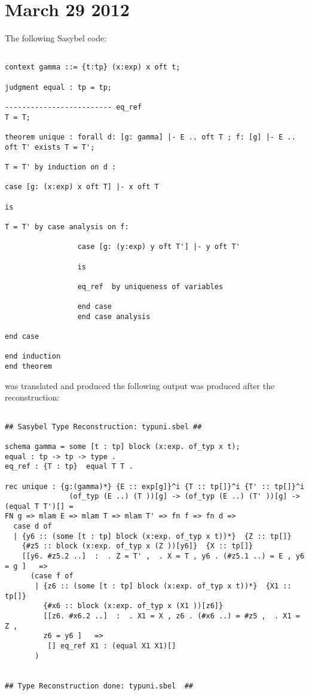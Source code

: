 \documentclass[12pt]{article}
\begin{document}
\section{March 29 2012}
The following \textmd{Sasybel} code:
\footnotesize\begin{verbatim}

context gamma ::= {t:tp} (x:exp) x oft t;

judgment equal : tp = tp;

------------------------- eq_ref
T = T;

theorem unique : forall d: [g: gamma] |- E .. oft T ; f: [g] |- E .. oft T' exists T = T';

T = T' by induction on d :

case [g: (x:exp) x oft T] |- x oft T

is

T = T' by case analysis on f:

                 case [g: (y:exp) y oft T'] |- y oft T'

                 is 

                 eq_ref  by uniqueness of variables

                 end case
                 end case analysis

end case

end induction
end theorem

\end{verbatim}
was translated and produced the following output was produced after the reconstruction:
\footnotesize\begin{verbatim}

## Sasybel Type Reconstruction: typuni.sbel ##

schema gamma = some [t : tp] block (x:exp. of_typ x t);
equal : tp -> tp -> type .
eq_ref : {T : tp}  equal T T .

rec unique : {g:(gamma)*} {E :: exp[g]}^i {T :: tp[]}^i {T' :: tp[]}^i
               (of_typ (E ..) (T ))[g] -> (of_typ (E ..) (T' ))[g] -> (equal T T')[] = 
FN g => mlam E => mlam T => mlam T' => fn f => fn d => 
  case d of 
  | {y6 :: (some [t : tp] block (x:exp. of_typ x t))*}  {Z :: tp[]} 
    {#z5 :: block (x:exp. of_typ x (Z ))[y6]}  {X :: tp[]}
    [[y6. #z5.2 ..]  :  . Z = T' ,  . X = T , y6 . (#z5.1 ..) = E , y6 = g ]   => 
      (case f of 
       | {z6 :: (some [t : tp] block (x:exp. of_typ x t))*}  {X1 :: tp[]} 
         {#x6 :: block (x:exp. of_typ x (X1 ))[z6]}
         [[z6. #x6.2 ..]  :  . X1 = X , z6 . (#x6 ..) = #z5 ,  . X1 = Z ,
         z6 = y6 ]   => 
          [] eq_ref X1 : (equal X1 X1)[]
       )
  

## Type Reconstruction done: typuni.sbel  ##

\end{verbatim}
\end{document}
